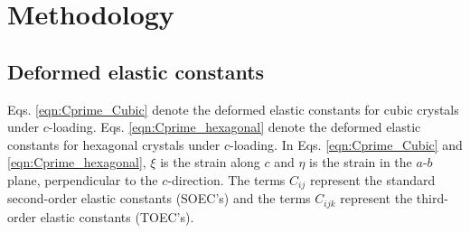 \documentclass[showpacs,aps,floatfix,prb,reprint,superscriptaddress]{revtex4-1}
\begin{document}
%

\section{Methodology}
\subsection{Deformed elastic constants}
Eqs. \ref{eqn:Cprime_Cubic} denote the deformed elastic constants for cubic crystals under $c$-loading. Eqs. \ref{eqn:Cprime_hexagonal} denote the deformed elastic constants for hexagonal crystals under $c$-loading. In Eqs. \ref{eqn:Cprime_Cubic} and \ref{eqn:Cprime_hexagonal}, $\xi$ is the strain along $c$ and $\eta$ is the strain in the $a$-$b$ plane, perpendicular to the $c$-direction. The terms $C_{ij}$ represent the standard second-order elastic constants (SOEC's) and the terms $C_{ijk}$ represent the third-order elastic constants (TOEC's).
\end{document}
